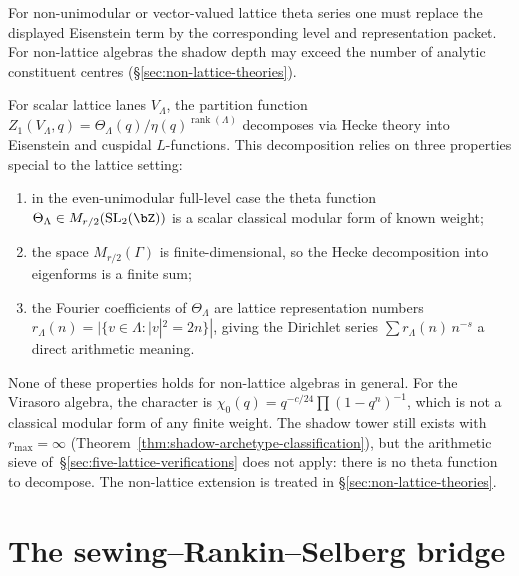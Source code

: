 For non-unimodular or vector-valued lattice theta series
one must replace the displayed Eisenstein term by the corresponding
level and representation packet. For non-lattice algebras the shadow
depth may exceed the number of analytic constituent centres
(\S\ref{sec:non-lattice-theories}).

\begin{remark}
\label{rem:lattice-specificity}
For scalar lattice lanes $V_\Lambda$, the partition function
$Z_1(V_\Lambda, q) = \Theta_\Lambda(q) / \eta(q)^{\operatorname{rank}(\Lambda)}$
decomposes via Hecke theory into Eisenstein and cuspidal
$L$-functions. This decomposition relies on three properties
special to the lattice setting:
\begin{enumerate}[label=\textup{(\roman*)}]
\item in the even-unimodular full-level case the theta function
 $\Theta_\Lambda \in M_{r/2}(\mathrm{SL}_2(\bZ))$ is a scalar
 classical modular form of known weight;
\item the space $M_{r/2}(\Gamma)$ is finite-dimensional, so the
 Hecke decomposition into eigenforms is a finite sum;
\item the Fourier coefficients of $\Theta_\Lambda$ are lattice
 representation numbers $r_\Lambda(n) = |\{v \in \Lambda :
 |v|^2 = 2n\}|$, giving the Dirichlet series
 $\sum r_\Lambda(n)\,n^{-s}$ a direct arithmetic meaning.
\end{enumerate}
None of these properties holds for non-lattice algebras in
general. For the Virasoro algebra, the character is
$\chi_0(q) = q^{-c/24}\prod(1-q^n)^{-1}$, which is not a
classical modular form of any finite weight. The shadow tower
still exists with $r_{\max} = \infty$
(Theorem~\ref{thm:shadow-archetype-classification}), but the
arithmetic sieve of~\S\ref{sec:five-lattice-verifications} does
not apply: there is no theta function to decompose.
The non-lattice extension is treated in
\S\ref{sec:non-lattice-theories}.
\end{remark}

\section{The sewing--Rankin--Selberg bridge}
\label{sec:sewing-RS-bridge}

